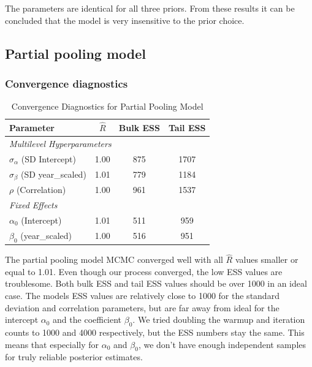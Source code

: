 \documentclass[12pt,a4paper]{article}
\begin{document}
The parameters are identical for all three priors. From these results it can be concluded that the model is very insensitive to the prior choice.

\subsection{Partial pooling model}

\subsubsection*{Convergence diagnostics}

\begin{table}[htbp]
  \centering
  \caption{Convergence Diagnostics for Partial Pooling Model}
  \begin{tabular}{lccc}
    \hline
    Parameter                        & $\hat{R}$ & Bulk ESS & Tail ESS \\
    \hline
    \multicolumn{4}{l}{\textit{Multilevel Hyperparameters}}            \\
    $\sigma_\alpha$ (SD Intercept)   & 1.00      & 875      & 1707     \\
    $\sigma_\beta$ (SD year\_scaled) & 1.01      & 779      & 1184     \\
    $\rho$ (Correlation)             & 1.00      & 961      & 1537     \\
    \multicolumn{4}{l}{\textit{Fixed Effects}}                         \\
    $\alpha_0$ (Intercept)           & 1.01      & 511      & 959      \\
    $\beta_0$ (year\_scaled)         & 1.00      & 516      & 951      \\
    \hline
  \end{tabular}
  \label{tab:convergence}
\end{table}

The partial pooling model MCMC converged well with all $\hat{R}$ values smaller or equal to 1.01. Even though our process converged, the low ESS values are troublesome. Both bulk ESS and tail ESS values should be over 1000 in an ideal case. The models ESS values are relatively close to 1000 for the standard deviation and correlation parameters, but are far away from ideal for the intercept $\alpha_0$ and the coefficient $\beta_0$. We tried doubling the warmup and iteration counts to 1000 and 4000 respectively, but the ESS numbers stay the same. This means that especially for $\alpha_0$ and $\beta_0$, we don't have enough independent samples for truly reliable posterior estimates.
\end{document}
